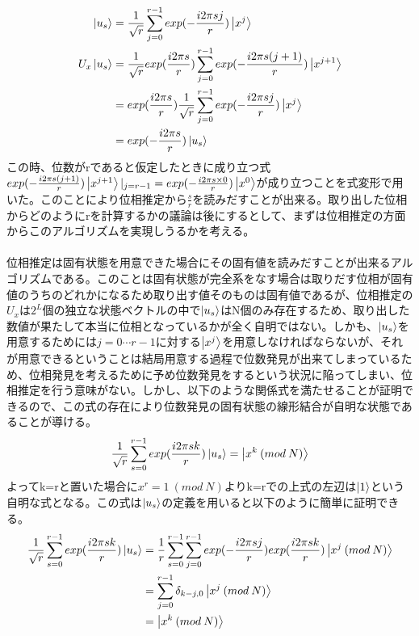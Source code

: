 \documentclass[a4paper,10.5pt]{article}
\numberwithin{equation}{section}
\begin{document}
 \begin{equation}\begin{split}
     \ket{u_{s}} &= \frac{1}{\sqrt{r}}\sum_{j=0} ^{r-1}exp(-\frac{i2\pi s j}{r}) \ket{x^{j}}\\
     U_{x}\ket{u_{s}}
     &=\frac{1}{\sqrt{r}}exp(\frac{i2\pi s}{r}) \sum_{j=0} ^{r-1} 
                       exp(-\frac{i2\pi s (j+1)}{r}) \ket{x^{j+1}}\\
     &=exp(\frac{i2\pi s}{r}) \frac{1}{\sqrt{r}}\sum_{j=0} ^{r-1} 
     exp(-\frac{i2\pi s j}{r}) \ket{x^{j}}\\
     &=exp(-\frac{i2\pi s}{r}) \ket{u_{s}}
 \end{split} \end{equation}
この時、位数がrであると仮定したときに成り立つ式$exp(-\frac{i2\pi s (j+1)}{r})\ket{x^{j+1} }|_{j=r-1}= exp(-\frac{i2\pi s \times0}{r})\ket{x^{0}}$が成り立つことを式変形で用いた。このことにより位相推定から$\frac{s}{r}$を読みだすことが出来る。取り出した位相からどのようにrを計算するかの議論は後にするとして、まずは位相推定の方面からこのアルゴリズムを実現しうるかを考える。\\
\\
位相推定は固有状態を用意できた場合にその固有値を読みだすことが出来るアルゴリズムである。このことは固有状態が完全系をなす場合は取りだす位相が固有値のうちのどれかになるため取り出す値そのものは固有値であるが、位相推定の$U_{x}$は$2^{L}$個の独立な状態ベクトルの中で$\ket{u_{s}}$はN個のみ存在するため、取り出した数値が果たして本当に位相となっているかが全く自明ではない。しかも、$\ket{u_{s}}$を用意するためには$j=0 \cdots r-1$に対する$\ket{x^{j}}$を用意しなければならないが、それが用意できるということは結局用意する過程で位数発見が出来てしまっているため、位相発見を考えるために予め位数発見をするという状況に陥ってしまい、位相推定を行う意味がない。しかし、以下のような関係式を満たせることが証明できるので、この式の存在により位数発見の固有状態の線形結合が自明な状態であることが導ける。
 \begin{equation}\begin{split}
     \frac{1}{\sqrt{r}}\sum_{s=0}^{r-1} exp(\frac{i2\pi s k}{r})\ket{u_{s}}
     = \ket{x^{k}\:(mod\:N)}
 \end{split} \end{equation}
よってk=rと置いた場合に$x^{r}=1\:(mod\:N)$よりk=rでの上式の左辺は$\ket{1}$という自明な式となる。この式は$\ket{u_{s}}$の定義を用いると以下のように簡単に証明できる。
\begin{equation}\begin{split}
    \frac{1}{\sqrt{r}}\sum_{s=0}^{r-1} exp(\frac{i2\pi s k}{r})\ket{u_{s}}
    &= \frac{1}{r}\sum_{s=0}^{r-1} \sum_{j=0} ^{r-1}
      exp(-\frac{i2\pi s j}{r}) exp(\frac{i2\pi s k}{r})\ket{x^{j}\:(mod\:N)}\\
    &=\sum_{j=0} ^{r-1} \delta_{k-j,0} \ket{x^{j}\:(mod\:N)}\\
    &=\ket{x^{k}\:(mod\:N)}
\end{split} \end{equation}
\end{document}
